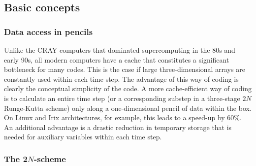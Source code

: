 \documentclass[12pt,twoside,notitlepage,a4paper]{article}
\begin{document}

\subsection{Basic concepts}

\subsubsection{Data access in pencils}

Unlike the CRAY computers that dominated supercomputing in the 80s and
early 90s, all modern computers have a cache that constitutes a significant
bottleneck for many codes. This is the case if large three-dimensional
arrays are constantly used within each time step. The advantage of this
way of coding is clearly the conceptual simplicity of the code. A more
cache-efficient way of coding is to calculate an entire time step (or
a corresponding substep in a three-stage $2N$ Runge-Kutta scheme) only
along a one-dimensional pencil of data within the box. On Linux and Irix
architectures, for example, this leads to a speed-up by 60\%. An additional
advantage is a drastic reduction in temporary storage that is needed for
auxiliary variables within each time step.


\subsubsection{The 2$N$-scheme}
\end{document}
